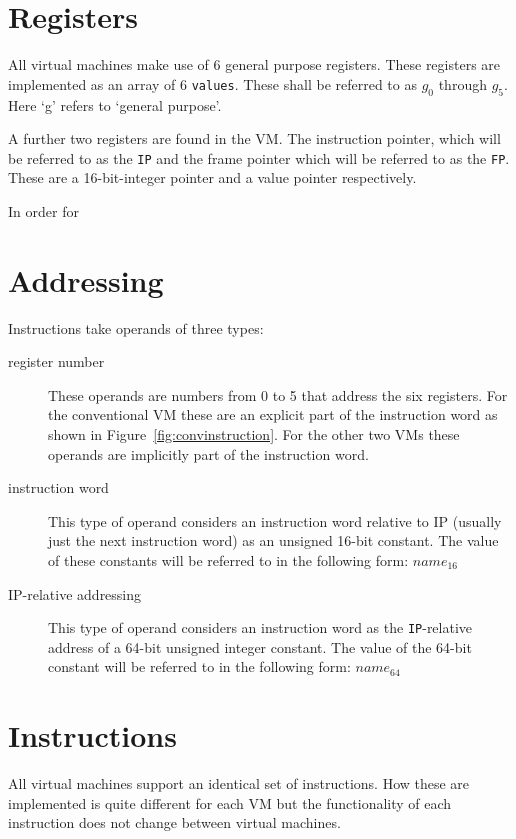 \documentclass[english,a4paper]{report}
\begin{document}
\section{Registers}

All virtual machines make use of 6 general purpose registers. These
registers are implemented as an array of 6 \verb|values|. These shall
be referred to as $g_0$ through $g_5$. Here `g' refers to `general
purpose'.

A further two registers are found in the VM. The instruction pointer,
which will be referred to as the \verb|IP| and the frame pointer which
will be referred to as the \verb|FP|. These are a 16-bit-integer
pointer and a value pointer respectively.

In order for 

\section{Addressing}

Instructions take operands of three types:
\begin{description}
\item[register number] These operands are numbers from 0 to 5 that
  address the six registers. For the conventional VM these are an
  explicit part of the instruction word as shown in
  Figure~\ref{fig:convinstruction}. For the other two VMs these
  operands are implicitly part of the instruction word.
\item[instruction word] This type of operand considers an instruction
  word relative to IP (usually just the next instruction word) as an
  unsigned 16-bit constant. The value of these constants will be
  referred to in the following form: $name_{16}$
\item[IP-relative addressing] This type of operand considers an
  instruction word as the \verb|IP|-relative address of a 64-bit
  unsigned integer constant. The value of the 64-bit constant will be
  referred to in the following form: $name_{64}$
\end{description}

\section{Instructions}

All virtual machines support an identical set of instructions. How
these are implemented is quite different for each VM but the
functionality of each instruction does not change between virtual
machines.
\end{document}
